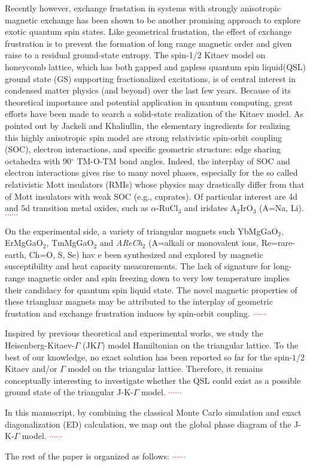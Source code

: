 \documentclass[aps,prb,reprint,groupedaddress,showpacs,amsfonts,amsmath,amssymb,superscriptaddress]{revtex4-1}
\begin{document}
Recently however, exchange frustation in systems with strongly anisotropic magnetic exchange has been shown to be another promising approach to explore exotic quantum spin states. Like geometrical frustation, the effect of exchange frustration is to prevent the formation of long range magnetic order and given raise to a residual ground-state entropy. The spin-1/2 Kitaev model on honeycomb lattice, which has both gapped and gapless quantum spin liquid(QSL) ground state (GS) supporting fractionalized excitations, is of central interest in condensed matter physics (and beyond) over the last few years. Because of its theoretical importance and potential application in quantum computing, great efforts have been made to search a solid-state realization of the Kitaev model. As pointed out by Jackeli and Khaliullin, the elementary ingredients for realizing this highly anisotropic spin model are strong relativistic spin-orbit coupling (SOC), electron interactions, and specific geometric structure: edge sharing octahedra with 90$^\circ$ TM-O-TM bond angles. Indeed, the interplay of SOC and electron interactions gives rise to many novel phases, especially for the so called relativistic Mott insulators (RMIs) whose physics may drastically differ from that of Mott insulators with weak SOC (e.g., cuprates). Of particular interest are 4d and 5d transition metal oxides, such as $\alpha$-RuCl$_3$ and iridates A$_2$IrO$_3$ (A=Na, Li).
\textcolor{red}{$\cdots\cdots$}

On the experimental side, a variety of triangular magnets such YbMgGaO$_2$, ErMgGaO$_2$, TmMgGaO$_2$ and \emph{AReCh}$_2$ (A=alkali or monovalent ions, Re=rare-earth, Ch=O, S, Se) hav e been synthesized and explored by magnetic susceptibility and heat capacity measurements. The lack of signature for long-range magnetic order and spin freezing down to very low temperature implies their candidacy for quantum spin liquid state. The novel magnetic properties of these triangluar magnets may be attributed to the interplay of geometric frustation and exchange frustration induces by spin-orbit coupling. \textcolor{red}{$\cdots\cdots$}

Inspired by previous theoretical and experimental works, we study the Heisenberg-Kitaev-$\Gamma$ (JK$\Gamma$) model Hamiltonian on the triangular lattice. To the best of our knowledge, no exact solution has been reported so far for the spin-$1/2$ Kitaev and/or $\Gamma$ model on the triangular lattice. Therefore, it remains conceptually interesting to investigate whether the QSL could exist as a possible ground state of the triangular J-K-$\Gamma$ model. \textcolor{red}{$\cdots\cdots$}

In this manuscript, by combining the classical Monte Carlo simulation and exact diagonalization (ED) calculation, we map out the global phase diagram of the J-K-$\Gamma$ model. \textcolor{red}{$\cdots\cdots$}

The rest of the paper is organized as follows: \textcolor{red}{$\cdots\cdots$}
\end{document}

